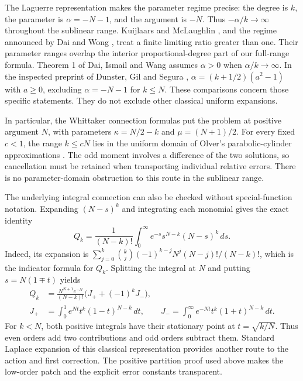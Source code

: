 \documentclass[11pt]{article}
\theoremstyle{definition}
\theoremstyle{remark}
\newcommand{\1}{\mathbf 1}
\begin{document}
The Laguerre representation makes the parameter regime precise: the degree is $k$, the parameter is $\alpha=-N-1$, and the argument is $-N$. Thus $-\alpha/k\to\infty$ throughout the sublinear range. Kuijlaars and McLaughlin \cite[Theorem 7.1 and Remark 5.4]{KM}, and the regime announced by Dai and Wong \cite{DW}, treat a finite limiting ratio greater than one. Their parameter ranges overlap the interior proportional-degree part of our full-range formula. Theorem 1 of Dai, Ismail and Wang \cite{DIW} assumes $\alpha>0$ when $\alpha/k\to\infty$. In the inspected preprint of Dunster, Gil and Segura \cite[Section 1, equation (1.6) and Cases 1a, 1b and 2]{DGS}, $\alpha=(k+1/2)(a^2-1)$ with $a\ge0$, excluding $\alpha=-N-1$ for $k\le N$. These comparisons concern those specific statements. They do not exclude other classical uniform expansions.

In particular, the Whittaker connection formulas put the problem at positive argument $N$, with parameters $\kappa=N/2-k$ and $\mu=(N+1)/2$. For every fixed $c<1$, the range $k\le cN$ lies in the uniform domain of Olver's parabolic-cylinder approximations \cite{Olver,DLMFWhittaker}. The odd moment involves a difference of the two solutions, so cancellation must be retained when transporting individual relative errors. There is no parameter-domain obstruction to this route in the sublinear range.

The underlying integral connection can also be checked without special-function notation. Expanding $(N-s)^k$ and integrating each monomial gives the exact identity
\begin{equation}\label{eq:gammaidentity}
Q_k=\frac1{(N-k)!}\int_0^\infty
e^{-s}s^{N-k}(N-s)^k\,ds.
\end{equation}
Indeed, its expansion is
$\sum_{j=0}^k\binom kj(-1)^{k-j}N^j(N-j)!/(N-k)!$,
which is the indicator formula for $Q_k$. Splitting the integral at $N$ and putting $s=N(1\mp t)$ yields
\begin{align*}
Q_k&=\frac{N^{N+1}e^{-N}}{(N-k)!}
\bigl(J_++(-1)^kJ_-\bigr),\\
J_+&=\int_0^1 e^{Nt}t^k(1-t)^{N-k}\,dt,\qquad
J_-=\int_0^\infty e^{-Nt}t^k(1+t)^{N-k}\,dt.
\end{align*}
For $k<N$, both positive integrals have their stationary point at $t=\sqrt{k/N}$. Thus even orders add two contributions and odd orders subtract them. Standard Laplace expansion of this classical representation provides another route to the action and first correction. The positive partition proof used above makes the low-order patch and the explicit error constants transparent.
\end{document}

